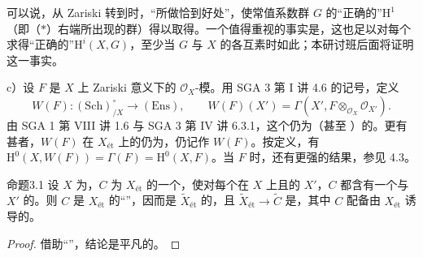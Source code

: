 可以说，从 Zariski 转到时，“所做恰到好处”，使常值系数群 $G$ 的“正确的”$\mathrm H^1$（即（$*$）右端所出现的群）得以取得。一个值得重视的事实是，这也足以对每个求得“正确的”$\mathrm H^i(X,G)$，至少当 $G$ 与 $X$ 的各互素时如此；本研讨班后面将证明这一事实。

c）设 $F$ 是 $X$ 上 Zariski 意义下的 $\mathscr O_X$-模。用 SGA 3 第 I 讲 4.6 的记号，定义
\[
 W(F):(\mathrm{Sch})_{/X}^\circ\longrightarrow(\mathrm{Ens}),\qquad
 W(F)(X')=\Gamma(X',F\otimes_{\mathscr O_X}\mathscr O_{X'}).
\]
由 SGA 1 第 VIII 讲 1.6 与 SGA 3 第 IV 讲 6.3.1，这个仍为（甚至 ）的。更有甚者，$W(F)$ 在 $X_{\text{ét}}$ 上的仍为，仍记作 $W(F)$。按定义，有 $\mathrm H^0(X,W(F))=\Gamma(F)=\mathrm H^0(X,F)$。当 $F$ 时，还有更强的结果，参见 4.3。

\begin{SGAresult}{命题}{3.1}
设 $X$ 为，$C$ 为 $X_{\text{ét}}$ 的一个，使对每个在 $X$ 上且的 $X'$，$C$ 都含有一个与 $X'$ 的。则 $C$ 是 $X_{\text{ét}}$ 的“”，因而是 $\widetilde X_{\text{ét}}$ 的，且 $\widetilde X_{\text{ét}}\to\widetilde C$ 是，其中 $C$ 配备由 $X_{\text{ét}}$ 诱导的。
\end{SGAresult}
\begin{proof}
借助“”，结论是平凡的。
\end{proof}

